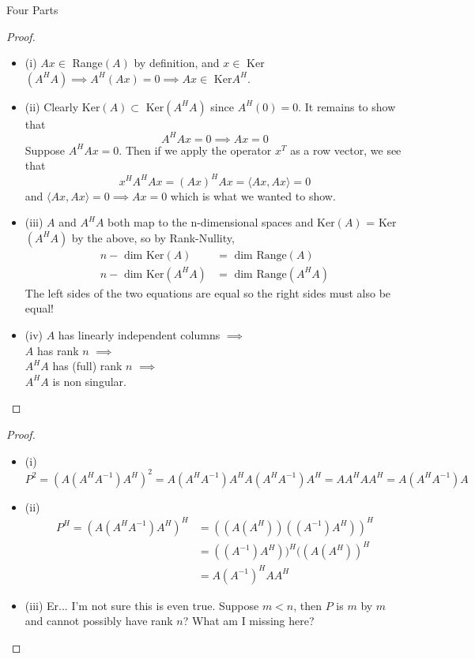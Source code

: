 \documentclass[12pt]{article}
\newenvironment{problem}[2][Problem]{\begin{trivlist}
\item[\hskip \labelsep {\bfseries #1}\hskip \labelsep {\bfseries #2.}]}{\end{trivlist}}
\theoremstyle{definition}
\theoremstyle{definition}
\theoremstyle{definition}
\theoremstyle{definition}
\begin{document}
\begin{problem}{3.46} Four Parts
\begin{proof}
\begin{itemize}
\item (i) $Ax \in$ Range$(A)$ by definition, and $x \in$ Ker$(A^HA) \implies A^H(Ax) = 0 \implies Ax \in$ Ker$A^H$.
\item (ii) Clearly Ker$(A) \subset $ Ker$(A^HA)$ since $A^H(0) = 0$. It remains to show that 
$$A^HAx = 0 \implies Ax = 0$$
Suppose $A^HAx = 0$. Then if we apply the operator $x^T$ as a row vector, we see that 
$$
x^HA^HAx = (Ax)^HAx = \langle Ax, Ax \rangle = 0
$$
and $\langle Ax, Ax \rangle = 0 \implies Ax = 0$ which is what we wanted to show.
\item (iii) $A$ and $A^HA$ both map to the n-dimensional spaces and Ker$(A)$ = Ker$(A^HA)$ by the above, so by Rank-Nullity,
\begin{align*}
n - \text{ dim Ker}(A) &= \text{ dim Range}(A) \\
n - \text{ dim Ker}(A^HA) &= \text{ dim Range}(A^HA)
\end{align*}
The left sides of the two equations are equal so the right sides must also be equal!
\item (iv) $A$ has linearly independent columns $\implies $ \\
$A$ has rank $n$ $\implies$ \\
$A^HA$ has (full) rank $n$ $\implies$ \\
$A^HA$ is non singular.
\end{itemize}
\end{proof}
\end{problem}

\begin{problem}{3.47}
\begin{proof}
\begin{itemize}
\item (i) $$P^2 = (A(A^HA^{-1})A^H)^2 = A(A^HA^{-1})A^HA(A^HA^{-1})A^H = AA^HAA^H = A(A^HA^{-1})A$$
\item (ii) \begin{align*}P^H = (A(A^HA^{-1})A^H)^H &= ((A(A^H))((A^{-1})A^H))^H \\
&=((A^{-1})A^H))^H((A(A^H))^H \\
&=A(A^{-1})^HAA^H
\end{align*}
\item (iii) Er... I'm not sure this is even true. Suppose $m < n$, then $P$ is $m$ by $m$ and cannot possibly have rank $n$? What am I missing here?
\end{itemize}
\end{proof}
\end{problem}
\end{document}
